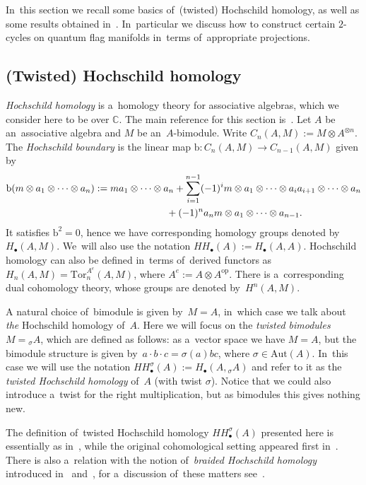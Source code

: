 \documentclass[pdftex]{sigma}
\numberwithin{equation}{section}
\begin{document}
In~this section we recall some basics of~(twisted) Hoch\-schild homology, as well as some results obtained in~\cite{twist-hoch}.
In~particular we discuss how to construct certain $2$-cycles on quantum flag manifolds in~terms of~appropriate projections.

\subsection{(Twisted) Hoch\-schild homology}

\emph{Hoch\-schild homology} is a~homology theory for associative algebras, which we consider here to be over $\mathbb{C}$.
The main reference for this section is~\cite{loday}.
Let $A$ be an~associative algebra and $M$ be an~$A$-bimodule.
Write $C_n (A, M) := M \otimes A^{\otimes n}$. The \emph{Hoch\-schild boundary} is the linear map $\mathrm{b}\colon C_n (A, M) \to C_{n - 1} (A, M)$ given by
\begin{gather*}
\mathrm{b} (m \otimes a_1 \otimes \cdots \otimes a_n) := m a_1 \otimes \cdots \otimes a_n
+ \sum_{i = 1}^{n - 1} (-1)^i m \otimes a_1 \otimes \cdots \otimes a_i a_{i + 1} \otimes \cdots \otimes a_n
 \\ \hphantom{\mathrm{b} (m \otimes a_1 \otimes \cdots \otimes a_n) :=}
{} + (-1)^n a_n m \otimes a_1 \otimes \cdots \otimes a_{n - 1}.
\end{gather*}
It satisfies $\mathrm{b}^2 = 0$, hence we have corresponding homology groups denoted by~$H_\bullet(A, M)$.
We~will also use the notation $HH_\bullet(A) := H_\bullet(A, A)$.
Hoch\-schild homology can also be defined in~terms of~derived functors as $H_n(A, M) = \mathrm{Tor}^{A^e}_n(A, M)$, where $A^e := A \otimes A^\mathrm{op}$.
There is a~corresponding dual cohomology theory, whose groups are denoted by~$H^n(A, M)$.

A natural choice of~bimodule is given by~$M = A$, in~which case we talk about \emph{the} Hoch\-schild homology of~$A$.
Here we will focus on the \emph{twisted bimodules} $M = {}_\sigma A$, which are defined as follows: as a~vector space we have $M = A$, but the bimodule structure is given by~$a \cdot b \cdot c = \sigma(a) b c $, where $\sigma \in \mathrm{Aut}(A)$.
In~this case we will use the notation $HH^\sigma_\bullet(A) := H_\bullet(A, {}_\sigma A)$ and refer to it as the \emph{twisted Hoch\-schild homology} of~$A$ (with twist $\sigma$).
Notice that we could also introduce a~twist for the right multiplication, but as bimodules this gives nothing new.

\begin{Remark}
The definition of~twisted Hoch\-schild homology $HH^\sigma_\bullet(A)$ presented here is essen\-ti\-ally as in~\cite{twisted-su2}, while the original cohomological setting appeared first in~\cite{kmt}.
There is also a~relation with the notion of~\emph{braided Hoch\-schild homology} introduced in~\cite{akrami-majid} and~\cite{baez}, for a~discussion of~these matters see~\cite[Example~3.9]{braided-homology}.
\end{Remark}
\end{document}
